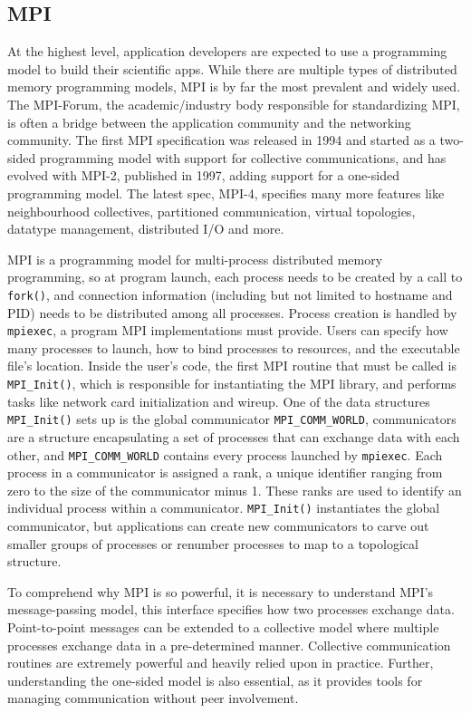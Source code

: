 \subsection{MPI}
At the highest level, application developers are expected to use a programming model to build their scientific apps. 
While there are multiple types of distributed memory programming models, MPI is by far the most prevalent and widely used.
The MPI-Forum, the academic/industry body responsible for standardizing MPI, is often a bridge between the application community and the networking community.
The first MPI specification was released in 1994 and started as a two-sided programming model with support for collective communications, and has evolved with MPI-2, published in 1997, adding support for a one-sided programming model.
The latest spec, MPI-4, specifies many more features like neighbourhood collectives, partitioned communication, virtual topologies, datatype management, distributed I/O and more.

MPI is a programming model for multi-process distributed memory programming, so at program launch, each process needs to be created by a call to \texttt{fork()}, and connection information (including but not limited to hostname and PID) needs to be distributed among all processes. 
Process creation is handled by \texttt{mpiexec}, a program MPI implementations must provide. 
Users can specify how many processes to launch, how to bind processes to resources, and the executable file's location.
Inside the user's code, the first MPI routine that must be called is \texttt{MPI\_Init()}, which is responsible for instantiating the MPI library, and performs tasks like network card initialization and wireup.
One of the data structures \texttt{MPI\_Init()} sets up is the global communicator \texttt{MPI\_COMM\_WORLD}, communicators are a structure encapsulating a set of processes that can exchange data with each other, and \texttt{MPI\_COMM\_WORLD} contains every process launched by \texttt{mpiexec}.
Each process in a communicator is assigned a rank, a unique identifier ranging from zero to the size of the communicator minus 1. 
These ranks are used to identify an individual process within a communicator.
\texttt{MPI\_Init()} instantiates the global communicator, but applications can create new communicators to carve out smaller groups of processes or renumber processes to map to a topological structure.

To comprehend why MPI is so powerful, it is necessary to understand MPI's message-passing model, this interface specifies how two processes exchange data.
Point-to-point messages can be extended to a collective model where multiple processes exchange data in a pre-determined manner.
Collective communication routines are extremely powerful and heavily relied upon in practice.
Further, understanding the one-sided model is also essential, as it provides tools for managing communication without peer involvement.

